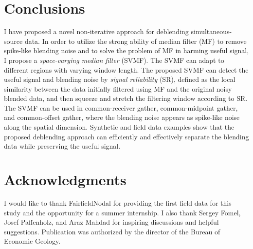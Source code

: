 \section{Conclusions}
I have proposed a novel non-iterative approach for deblending simultaneous-source data. In order to utilize the strong ability of median filter (MF) to remove spike-like blending noise and to solve the problem of MF in harming useful signal, I propose a \emph{space-varying median filter} (SVMF). The SVMF can adapt to different regions with varying window length. The proposed SVMF can detect the useful signal and blending noise by \emph{signal reliability} (SR), defined as the local similarity between the data initially filtered using MF and the original noisy blended data, and then squeeze and stretch the filtering window according to SR. The SVMF can be used in common-receiver gather, common-midpoint gather, and common-offset gather, where the blending noise appears as spike-like noise along the spatial dimension. Synthetic and field data examples show that the proposed deblending approach can efficiently and effectively separate the blending data while preserving the useful signal.

\section{Acknowledgments}
I would like to thank FairfieldNodal for providing the first field data for this study and the opportunity for a summer internship. I also thank Sergey Fomel, Josef Paffenholz, and Araz Mahdad for inspiring discussions and helpful suggestions. Publication was authorized by the director of the Bureau of Economic Geology.




\appendix
